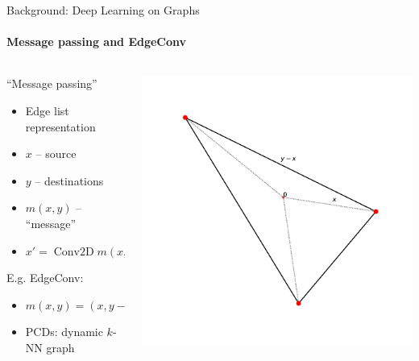 \begin{frame}{Background: Deep Learning on Graphs}
    \framesubtitle{Message passing and EdgeConv}

    \begin{columns}
        \begin{column}{.45\linewidth}
            ``Message passing''
            \begin{itemize}
                    \item Edge list representation
                    \item \( x \) -- source
                    \item \( y \) -- destinations
                    \item \( m(x, y) \) -- ``message''
                    \item \( x' = \operatorname{Conv2D} m(x, y) \)
            \end{itemize}
            E.g. EdgeConv:
            \begin{itemize}
                \item \( m(x, y) = (x, y-x) \)
                \item PCDs: dynamic \( k \)-NN graph
            \end{itemize}
        \end{column}
        \begin{column}{.5\linewidth}
            \includegraphics[width=\linewidth]{art/edgeconv-features.pdf}
        \end{column}
    \end{columns}
\end{frame}

